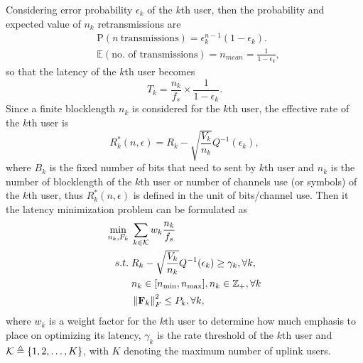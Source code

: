 \documentclass[a4paper, 12pt, onecolumn, journal, twoside, draftclsnofoot]{IEEEtran}
\begin{document}
Considering error probability $\epsilon_k$ of the $k$th user, then the probability and expected value of $n_k$ retransmissions are 
\begin{equation*}
    \begin{split}
        &\text{P}(n \ \text{transmissions}) = \epsilon_k^{n-1}(1-\epsilon_k). \\
        &\mathbb{E}( \text{no. of transmissions}) = n_{mean} = \frac{1}{1-\epsilon_k},
    \end{split}
\end{equation*}
so that the latency of the $k$th user becomes 
\begin{equation*}
    T_k  = \frac{n_k}{f_s} \times \frac{1}{1-\epsilon_k}.
\end{equation*}
Since a finite blocklength $n_k$ is considered for the $k$th user, the effective rate of the $k$th user is 
\begin{equation*}
	R_k^*(n, \epsilon) = R_k - \sqrt{\frac{V_k}{n_k}}Q^{-1}(\epsilon_k), 
\end{equation*}
where $B_k$ is the fixed number of bits that need to sent by $k$th user and $n_k$ is the number of blocklength of the $k$th user or number of channels use (or symbols) of the $k$th user, thus $R_k^*(n, \epsilon)$ is defined in the unit of bits/channel use.  Then it the latency minimization problem can be formulated as 
\begin{equation}
	\begin{split}
		\min_{n_k, F_k} &\; \sum_{k \in { \mathcal{K} }} w_k \frac{n_k}{f_s} \\
		s.t. &\;  R_k - \sqrt{\frac{V_k}{n_k}}Q^{-1}(\epsilon_k) \geq \gamma_k, \forall k, \\
		&\; n_k \in [ n_{\text{min}}, n_{\text{max}}], n_k \in \mathbb{Z}_+, \forall k \\
		&\; \left\| {\bf F}_k \right\|_F^2  \leq P_k, \forall k, 
	\end{split}
\label{eq_prob_form_basic}
\end{equation}
where $w_k$ is a weight factor for the $k$th user to determine how much emphasis to place on optimizing its latency, $\gamma_k$ is the rate threshold of the $k$th user and ${ \mathcal{K} } \triangleq \left\{1, 2, \ldots, K \right\}$, with $K$ denoting the maximum number of uplink users.
\end{document}

